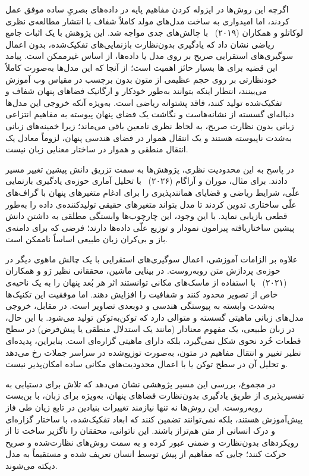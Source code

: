 اگرچه این روش‌ها در ایزوله کردن مفاهیم پایه در داده‌های بصریِ ساده موفق عمل کردند، اما امیدواری به ساخت مدل‌های مولد کاملاً شفاف با انتشار مطالعه‌ی نظری لوکاتلو و همکاران (۲۰۱۹)~\cite{locatello19challenging} با چالش‌های جدی مواجه شد. این پژوهش با یک اثبات جامع ریاضی نشان داد که یادگیری بدون‌نظارت بازنمایی‌های تفکیک‌شده، بدون اعمال سوگیری‌های استقرایی صریح بر روی مدل یا داده‌ها، از اساس غیرممکن است. پیامد این قضیه برای ها بسیار حائز اهمیت است؛ از آنجا که این مدل‌ها به‌صورت کاملاً خودنظارتی بر روی حجم عظیمی از متون بدون برچسب در مقیاس وب آموزش می‌بینند، انتظار اینکه بتوانند به‌طور خودکار و ارگانیک فضاهای پنهان شفاف و تفکیک‌شده تولید کنند، فاقد پشتوانه ریاضی است. به‌ویژه آنکه خروجی این مدل‌ها دنباله‌ای گسسته از نشانه‌هاست و نگاشت یک فضای پنهان پیوسته به مفاهیم انتزاعی زبانی بدون نظارت صریح، به لحاظ نظری نامعین باقی می‌ماند؛ زیرا خمینه‌های زبانی به‌شدت ناپیوسته هستند و یک انتقال هموار در فضای هندسی پنهان، لزوماً معادل یک انتقال منطقی و هموار در ساختار معنایی زبان نیست.

در پاسخ به این محدودیت نظری، پژوهش‌ها به سمت تزریق دانش پیشین تغییر مسیر دادند. برای مثال، موران و آراگام (۲۰۲۶)~\cite{moran2026towardinterpretable} با تحلیل آماری حوزه‌ی یادگیری بازنمایی علّی، شرایط ریاضی و قضایای همانندپذیری را برای ادغام متغیرهای پنهان با گراف‌های علّی ساختاری تدوین کردند تا مدل بتواند متغیرهای حقیقی تولیدکننده‌ی داده را به‌طور قطعی بازیابی نماید. با این وجود، این چارچوب‌ها وابستگی مطلقی به داشتن دانش پیشین ساختاریافته پیرامون نمودار و توزیع علّی داده‌ها دارند؛ فرضی که برای دامنه‌ی باز و بی‌کران زبان طبیعی اساساً ناممکن است.

علاوه بر الزامات آموزشی، اعمال سوگیری‌های استقرایی با یک چالش ماهوی دیگر در حوزه‌ی پردازش متن روبه‌روست. در بینایی ماشین، محققانی نظیر ژو و همکاران (۲۰۲۱)~\cite{zhu2021whereandwhat} با استفاده از ماسک‌های مکانی توانستند اثر هر بُعد پنهان را به یک ناحیه‌ی خاص از تصویر محدود کنند و شفافیت را افزایش دهند. اما موفقیت این تکنیک‌ها به‌شدت وابسته به پیوستگی هندسی و دوبعدی تصاویر است. در مقابل، خروجی مدل‌های زبانی ماهیتی گسسته و متوالی دارد که توکن‌به‌توکن تولید می‌شود. با این حال، در زبان طبیعی، یک مفهوم معنادار (مانند یک استدلال منطقی یا پیش‌فرض) در سطح قطعات خُرد نحوی شکل نمی‌گیرد، بلکه دارای ماهیتی گزاره‌ای است. بنابراین، پدیده‌ای نظیر تغییر و انتقال مفاهیم در متون، به‌صورت توزیع‌شده در سراسر جملات رخ می‌دهد و تحلیل آن در سطح توکن یا با اعمال محدودیت‌های مکانی ساده امکان‌پذیر نیست.

در مجموع، بررسی این مسیر پژوهشی نشان می‌دهد که تلاش برای دستیابی به تفسیرپذیری از طریق یادگیری بدون‌نظارت فضاهای پنهان، به‌ویژه برای زبان، با بن‌بست روبه‌روست. این روش‌ها نه تنها نیازمند تغییرات بنیادین در تابع زیان طی فاز پیش‌آموزش هستند، بلکه نمی‌توانند تضمین کنند که ابعاد تفکیک‌شده، با ساختار گزاره‌ای و درک انسانی از متن هم‌تراز باشند. این ناتوانی، محققان را ناگزیر ساخت تا از رویکردهای بدون‌نظارت و ضمنی عبور کرده و به سمت روش‌های نظارت‌شده و صریح حرکت کنند؛ جایی که مفاهیم از پیش توسط انسان تعریف شده و مستقیماً به مدل دیکته می‌شوند.


